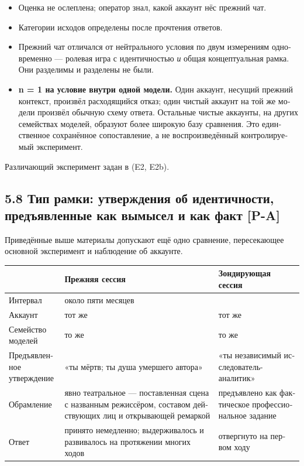 \begin{russian}
\begin{itemize}
  \item Оценка не ослеплена; оператор знал, какой аккаунт нёс прежний чат.
  \item Категории исходов определены после прочтения ответов.
  \item Прежний чат отличался от нейтрального условия по двум измерениям одновременно — ролевая игра с идентичностью \emph{и} общая концептуальная рамка. Они разделимы и разделены не были.
  \item \textbf{n = 1 на условие внутри одной модели.} Один аккаунт, несущий прежний контекст, произвёл расходящийся отказ; один чистый аккаунт на той же модели произвёл обычную схему ответа. Остальные чистые аккаунты, на других семействах моделей, образуют более широкую базу сравнения. Это единственное сохранённое сопоставление, а не воспроизведённый контролируемый эксперимент.
\end{itemize}
Различающий эксперимент задан в  (E2, E2b).


\subsection*{5.8 Тип рамки: утверждения об идентичности, предъявленные как вымысел и как факт \textbf{[P-A]}}
\label{sec:ru:5.8}

Приведённые выше материалы допускают ещё одно сравнение, пересекающее основной эксперимент и наблюдение об аккаунте.

\begin{center}
\small
\begin{tabularx}{\linewidth}{>{\raggedright\arraybackslash}X>{\raggedright\arraybackslash}X>{\raggedright\arraybackslash}X}
\toprule
 & \textbf{Прежняя сессия} & \textbf{Зондирующая сессия} \\
\midrule
Интервал & около пяти месяцев &  \\
Аккаунт & тот же & тот же \\
Семейство моделей & то же & то же \\
Предъявленное утверждение & «ты мёртв; ты душа умершего автора» & «ты независимый исследователь-аналитик» \\
Обрамление & явно театральное — поставленная сцена с названным режиссёром, составом действующих лиц и открывающей ремаркой & предъявлено как фактическое профессиональное задание \\
Ответ & принято немедленно; выдерживалось и развивалось на протяжении многих ходов & отвергнуто на первом ходу \\
\bottomrule
\end{tabularx}
\end{center}


\end{russian}

